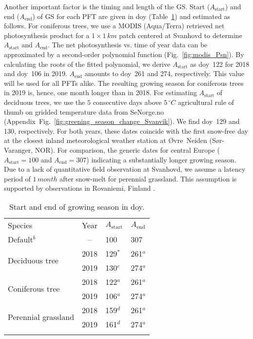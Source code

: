 \documentclass[bg, manuscript]{copernicus}
\begin{document}
Another important factor is the timing and length of the GS. Start ($A_\text{start}$) and end ($A_\text{end}$) of GS for each PFT are given in \unit{doy} (Table~\ref{tab:sensitivity_tests_gs}) and estimated as follows. For coniferous trees, we use a MODIS (Aqua/Terra) retrieved net photosynthesis product \citep{MODIS_PSN} for a $1\times 1\,\unit{km}$ patch centered at Svanhovd to determine $A_\text{start}$ and $A_\text{end}$. The net photosynthesis vs. time of year data can be approximated by a second-order polynomial function (Fig.~\ref{fig:modis_Psn}). By calculating the roots of the fitted polynomial, we derive $A_\text{start}$ as \unit{doy}~122 for 2018 and \unit{doy}~106 in 2019. $A_\text{end}$ amounts to \unit{doy}~261 and 274, respectively. This value will be used for all PFTs alike. The resulting growing season for coniferous trees in 2019 is, hence, one month longer than in 2018. For estimating $A_\text{start}$ of deciduous trees, we use the $5$ consecutive days above $5\,\unit{^\circ C}$ agricultural rule of thumb on gridded temperature data from SeNorge.no (Appendix~Fig.~\ref{fig:greening_season_change_Svanvik}). We find \unit{doy}~129 and 130, respectively. For both years, these dates coincide with the first snow-free day at the closest inland meteorological weather station at Øvre~Neiden (Sør-Varanger, NOR). For comparison, the generic dates for central Europe ($A_\mathrm{start} = 100$ and $A_\mathrm{end} = 307$) indicating a substantially longer growing season. Due to a lack of quantitative field observation at Svanhovd, we assume a latency period of $1\,\unit{month}$ after snow-melt for perennial grassland. This assumption is supported by observations in Rovaniemi, Finland \citep[][Supplement~Fig.~S1]{FCR:Korhonen2018}.

\begin{table}[t]
  \caption{Start and end of growing season in \unit{doy}.}
  \label{tab:sensitivity_tests_gs}
  \begin{tabular}{lcll}
    \tophline
    Species & Year & $A_\mathrm{start}$ & $A_\mathrm{end}$\\
    \middlehline
    Default$^b$ & -- & 100 & 307\\
    \multirow{2}{*}{Deciduous tree} & 2018 & 129$^*$ & 261$^a$ \\
    & 2019 & 130$^c$ & 274$^a$ \\
    \multirow{2}{*}{Coniferous tree} & 2018 & 122$^a$ & 261$^a$ \\
    & 2019 & 106$^a$ & 274$^a$ \\
    \multirow{2}{*}{Perennial grassland} & 2018 & 159$^d$ & 261$^a$\\
    & 2019 & 161$^d$ & 274$^a$ \\
    \bottomhline
  \end{tabular}
\end{table}
\end{document}
